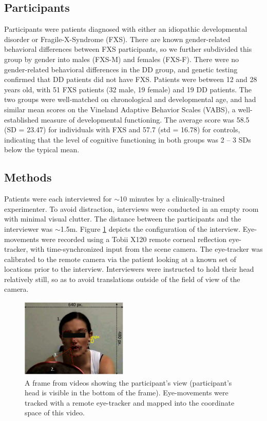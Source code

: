 \documentclass[10pt,twocolumn,letterpaper]{article}
\begin{document}
\subsection{Participants}
Participants were patients diagnosed with either an idiopathic developmental disorder or Fragile-X-Syndrome (FXS). There are known gender-related behavioral differences between FXS participants, so we further subdivided this group by gender into males (FXS-M) and females (FXS-F). There were no gender-related behavioral differences in the DD group, and genetic testing confirmed that DD patients did not have FXS. Patients were between 12 and 28 years old, with 51 FXS patients (32 male, 19 female) and 19 DD patients. The two groups were well-matched on chronological and developmental age, and had similar mean scores on the Vineland Adaptive Behavior Scales (VABS), a well-established measure of developmental functioning. The average score was 58.5 (SD = 23.47) for individuals with FXS and 57.7 (std = 16.78) for controls, indicating that the level of cognitive functioning in both groups was 2 -- 3 SDs below the typical mean.


\subsection {Methods}
Patients were each interviewed for $\sim$10 minutes by a clinically-trained experimenter. To avoid distraction, interviews were conducted in an empty room with minimal visual clutter. The distance between the participants and the interviewer was $\sim$1.5m. Figure \ref{fig:environment} depicts the configuration of the interview. Eye-movements were recorded using a Tobii X120 remote corneal reflection eye-tracker, with time-synchronized input from the scene camera. The eye-tracker was calibrated to the remote camera via the patient looking at a known set of locations prior to the interview.  Interviewers were instructed to hold their head relatively still, so as to avoid translations outside of the field of view of the camera.

\begin{figure}[ht]   
 \centering
           \includegraphics[width=2in,height= 1.5in]{figures/Real.png}
 \caption{A frame from videos showing the participant's view (participant's head is visible in the bottom of the frame). Eye-movements were tracked with a remote eye-tracker and mapped into the coordinate space of this video.}
\label{fig:environment}
\end{figure}
\end{document}

